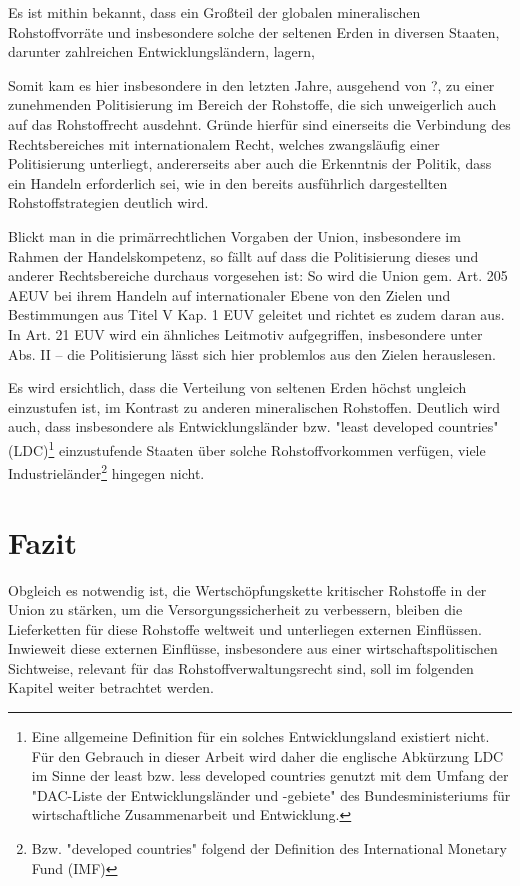 \documentclass[12pt,a4paper,oneside]{book} %
\begin{document}
	Es ist mithin bekannt, dass ein Großteil der globalen mineralischen Rohstoffvorräte und insbesondere solche der seltenen Erden in diversen Staaten, darunter zahlreichen Entwicklungsländern, lagern, 
	
	Somit kam es hier insbesondere in den letzten Jahre, ausgehend von ?, zu einer zunehmenden Politisierung im Bereich der Rohstoffe, die sich unweigerlich auch auf das Rohstoffrecht ausdehnt. Gründe hierfür sind einerseits die Verbindung des Rechtsbereiches mit internationalem Recht, welches zwangsläufig einer Politisierung unterliegt, andererseits aber auch die Erkenntnis der Politik, dass ein Handeln erforderlich sei, wie in den bereits ausführlich dargestellten Rohstoffstrategien deutlich wird.
	
	Blickt man in die primärrechtlichen Vorgaben der Union, insbesondere im Rahmen der Handelskompetenz, so fällt auf dass die Politisierung dieses und anderer Rechtsbereiche durchaus vorgesehen ist: So wird die Union gem. Art. 205 AEUV bei ihrem Handeln auf internationaler Ebene von den Zielen und Bestimmungen aus Titel V Kap. 1 EUV geleitet und richtet es zudem daran aus. In Art. 21 EUV wird ein ähnliches Leitmotiv aufgegriffen, insbesondere unter Abs. II -- die Politisierung lässt sich hier problemlos aus den Zielen herauslesen.
	
	
	
	Es wird ersichtlich, dass die Verteilung von seltenen Erden höchst ungleich einzustufen ist, im Kontrast zu anderen mineralischen Rohstoffen. Deutlich wird auch, dass insbesondere als Entwicklungsländer bzw. "least developed countries" (LDC)\footnote{Eine allgemeine Definition für ein solches Entwicklungsland existiert nicht. Für den Gebrauch in dieser Arbeit wird daher die englische Abkürzung LDC im Sinne der least bzw. less developed countries genutzt mit dem Umfang der "DAC-Liste der Entwicklungsländer und -gebiete" des Bundesministeriums für wirtschaftliche Zusammenarbeit und Entwicklung.} einzustufende Staaten über solche Rohstoffvorkommen verfügen, viele Industrieländer\footnote{Bzw. "developed countries"  folgend der Definition des International Monetary Fund (IMF)} hingegen nicht. 
	
	\section{Fazit}
	Obgleich es notwendig ist, die Wertschöpfungskette kritischer Rohstoffe in der Union zu stärken, um die Versorgungssicherheit zu verbessern, bleiben die Lieferketten für diese Rohstoffe weltweit und unterliegen externen Einflüssen. Inwieweit diese externen Einflüsse, insbesondere aus einer wirtschaftspolitischen Sichtweise, relevant für das Rohstoffverwaltungsrecht sind, soll im folgenden Kapitel weiter betrachtet werden.
	
\end{document}
